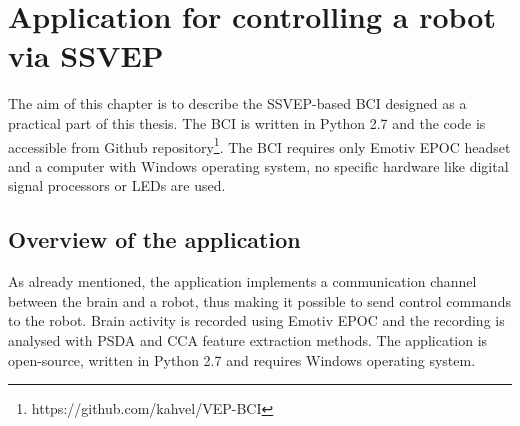 
\chapter{Application for controlling a robot via SSVEP}
\label{sec:SSVEP_BCI}

The aim of this chapter is to describe the \gls{SSVEP}-based \gls{BCI} designed as a practical part of this thesis. The \gls{BCI} is written in Python 2.7 and the code is accessible from Github repository\footnote{https://github.com/kahvel/VEP-BCI}. The \gls{BCI} requires only Emotiv EPOC headset and a computer with Windows operating system, no specific hardware like digital signal processors or \glspl{LED} are used.

\section{Overview of the application}
\label{sec:application}

As already mentioned, the application implements a communication channel between the brain and a robot, thus making it possible to send control commands to the robot. Brain activity is recorded using Emotiv EPOC and the recording is analysed with \gls{PSDA} and \gls{CCA} \gls{feature extraction} methods. The application is open-source, written in Python 2.7 and requires Windows operating system.

